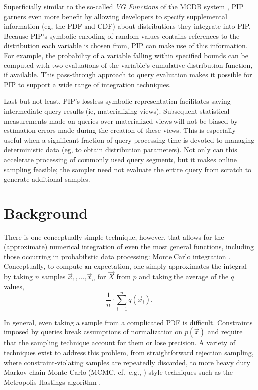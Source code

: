 Superficially similar to the so-called {\em VG Functions} of the MCDB system \cite{MCDB}, PIP garners even more benefit by allowing developers to specify supplemental information (eg, the PDF and CDF) about distributions they integrate into PIP.  Because PIP's symbolic encoding of random values contains references to the distribution each variable is chosen from, PIP can make use of this information.  For example, the probability of a variable falling within specified bounds can be computed with two evaluations of the variable's cumulative distribution function, if available.  This pass-through approach to query evaluation makes it possible for PIP to support a wide range of integration techniques.

Last but not least, PIP's lossless symbolic representation facilitates saving intermediate query results (ie, materializing views).  Subsequent statistical measurements made on queries over materialized views will not be biased by estimation errors made during the creation of these views.  This is especially useful when a significant fraction of query processing time is devoted to managing deterministic data (eg, to obtain distribution parameters).  Not only can this accelerate processing of commonly used query segments, but it makes online sampling feasible; the sampler need not evaluate the entire query from scratch to generate additional samples.

\section{Background}
There is one conceptually simple technique, however, that  allows for the (approximate) numerical integration of even  the most general  functions, including those occurring in  probabilistic data  processing: Monte Carlo integration \cite{montecarlo}. Conceptually, to compute an expectation, one simply approximates   the  integral  by  taking $n$ samples $\vec{x}_1, \dots, \vec{x}_n$ for $\vec{X}$ from $p$  and  taking  the  average of the $q$ values,
%
\begin{equation}\label{eq:mc_expectation}
\frac{1}{n} \cdot \sum_{i=1}^n q(\vec{x}_i).
\end{equation}

In general, even taking a sample from a complicated PDF is difficult.  Constraints imposed by queries break assumptions of normalization on $p(\vec x)$ and require that the sampling technique account for them or lose precision.  A variety of techniques exist to address this problem, from straightforward rejection sampling, where constraint-violating samples are repeatedly discarded, to more heavy duty Markov-chain Monte Carlo (MCMC, cf.\ e.g., \cite{GRS1995}) style techniques such as the Metropolis-Hastings algorithm \cite{metropolis,GRS1995}. 

